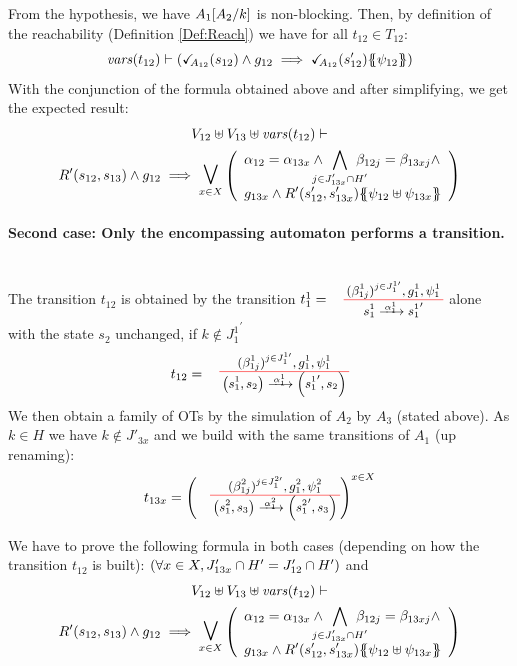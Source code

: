 \documentclass[runningheads]{llncs}
\begin{document}
\begin{enumerate}
From the hypothesis, we have \(A_1{\left[A_2\middle/k\right]}\) is non-blocking.  Then, by definition of the reachability  (Definition \ref{Def:Reach}) we have  for all $t_{12} \in T_{12}$:
\[ \fvars{t_{12}} \vdash \left(\reach{A_{12}}\mpar{s_{12}} \wedge g_{12} \implies \reach{A_{12}}\mpar{s_{12}'}\psubst{\psi_{12}}\right) \]	
With the conjunction of the  formula obtained above and after simplifying, we get the expected result:
\begin{multline*}	
V_{12} \uplus V_{13} \uplus \fvars{t_{12}} \vdash\\ R'\mpar{s_{12}, s_{13}} \wedge g_{12} \implies \operatorname*{\bigsymb{\bigvee}}_{x \in X} \mpar{\everymath{\displaystyle}\begin{array}{l}
			\alpha_{12} = \alpha_{13x} \wedge \bigwedge_\subbox{j \in J'_{13x} \cap H'} \beta_{12j} = \beta_{13xj} \wedge\\[12pt]
			 g_{13x} \wedge R'\mpar{s'_{12}, s'_{13x}}\psubst{\psi_{12} \uplus \psi_{13x}}
		\end{array}} 
	\end{multline*}

\smallskip
\paragraph{Second case: Only the encompassing automaton performs a transition.}~\\
The transition $t_{12}$ is obtained  by  the transition $t_1^1=
\OT{ s^1_1}{{s^1_1}'}{\alpha_1^1}{{(\beta^1_{1j})^{j \in J^{1 \prime}_1} }}{ g^1_1 }{ \psi^1_1}$  alone with the state $s_2$ unchanged, if $k \not\in {J^1_{1}}^{\prime}$
\[t_{12} = \OT{\mpar{s^1_1, s_2}}{\mpar{{s^1_1}', s_2}}{\alpha_1^1}{ {(\beta^1_{1j})^{j \in J^{1 \prime}_1} }}{g^1_1}{\psi^1_1}
\]
We then obtain a family of OTs by the simulation of $A_2$ by $A_3$ (stated above).
As  $k \in H$ we have $k \not\in J'_{3x}$ and we build with the same transitions of $A_1$ (up renaming):
\[t_{13x} = \left(\OT{\mpar{s^2_1, s_3}}{\mpar{{s^2_1}', s_{3}}}{\alpha_1^2}{ {(\beta^2_{1j})^{j \in J^{2 \prime}_1} }}{g^2_1}{\psi^2_1} \right)^{x\in X}\]
\end{enumerate}
We have to  prove the following formula in both cases (depending on how the transition $t_{12}$ is built): ${\left(\forall x \in X, J'_{13x} \cap H' = J'_{12} \cap H'\right)}$ and
\begin{multline*}	
V_{12} \uplus V_{13} \uplus \fvars{t_{12}} \vdash\\ R'\mpar{s_{12}, s_{13}} \wedge g_{12} \implies \operatorname*{\bigsymb{\bigvee}}_{x \in X} \mpar{\everymath{\displaystyle}\begin{array}{l}
			\alpha_{12} = \alpha_{13x} \wedge \bigwedge_\subbox{j \in J'_{13x} \cap H'} \beta_{12j} = \beta_{13xj} \wedge\\[12pt]
			 g_{13x} \wedge R'\mpar{s'_{12}, s'_{13x}}\psubst{\psi_{12} \uplus \psi_{13x}}
		\end{array}} 
	\end{multline*}
\end{document}
